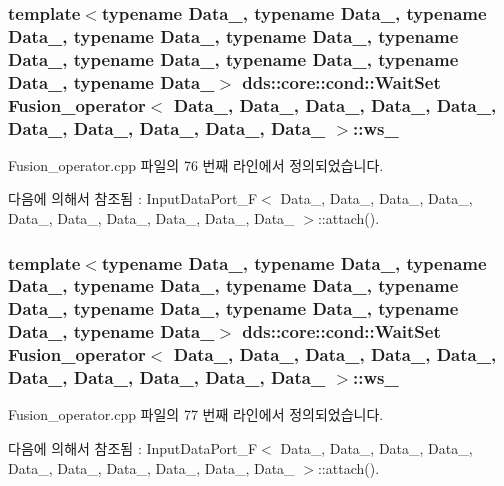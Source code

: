 \subsubsection[{\texorpdfstring{ws\+\_\+1}{ws_1}}]{\setlength{\rightskip}{0pt plus 5cm}template$<$typename Data\+\_, typename Data\+\_, typename Data\+\_, typename Data\+\_, typename Data\+\_, typename Data\+\_, typename Data\+\_, typename Data\+\_, typename Data\+\_, typename Data\+\_$>$ dds\+::core\+::cond\+::\+Wait\+Set {\bf Fusion\+\_\+operator}$<$ Data\+\_, Data\+\_, Data\+\_, Data\+\_, Data\+\_, Data\+\_, Data\+\_, Data\+\_, Data\+\_, Data\+\_ $>$\+::ws\+\_}\hypertarget{classFusion__operator_a6ca4a3185f87b382542eaf241eab3e52}{}\label{classFusion__operator_a6ca4a3185f87b382542eaf241eab3e52}


Fusion\+\_\+operator.\+cpp 파일의 76 번째 라인에서 정의되었습니다.



다음에 의해서 참조됨 \+:  Input\+Data\+Port\+\_\+\+F$<$ Data\+\_, Data\+\_, Data\+\_, Data\+\_, Data\+\_, Data\+\_, Data\+\_, Data\+\_, Data\+\_, Data\+\_ $>$\+::attach().

\subsubsection[{\texorpdfstring{ws\+\_\+2}{ws_2}}]{\setlength{\rightskip}{0pt plus 5cm}template$<$typename Data\+\_, typename Data\+\_, typename Data\+\_, typename Data\+\_, typename Data\+\_, typename Data\+\_, typename Data\+\_, typename Data\+\_, typename Data\+\_, typename Data\+\_$>$ dds\+::core\+::cond\+::\+Wait\+Set {\bf Fusion\+\_\+operator}$<$ Data\+\_, Data\+\_, Data\+\_, Data\+\_, Data\+\_, Data\+\_, Data\+\_, Data\+\_, Data\+\_, Data\+\_ $>$\+::ws\+\_}\hypertarget{classFusion__operator_af231872d2c22b353710ee90b6a2be4bf}{}\label{classFusion__operator_af231872d2c22b353710ee90b6a2be4bf}


Fusion\+\_\+operator.\+cpp 파일의 77 번째 라인에서 정의되었습니다.



다음에 의해서 참조됨 \+:  Input\+Data\+Port\+\_\+\+F$<$ Data\+\_, Data\+\_, Data\+\_, Data\+\_, Data\+\_, Data\+\_, Data\+\_, Data\+\_, Data\+\_, Data\+\_ $>$\+::attach().

